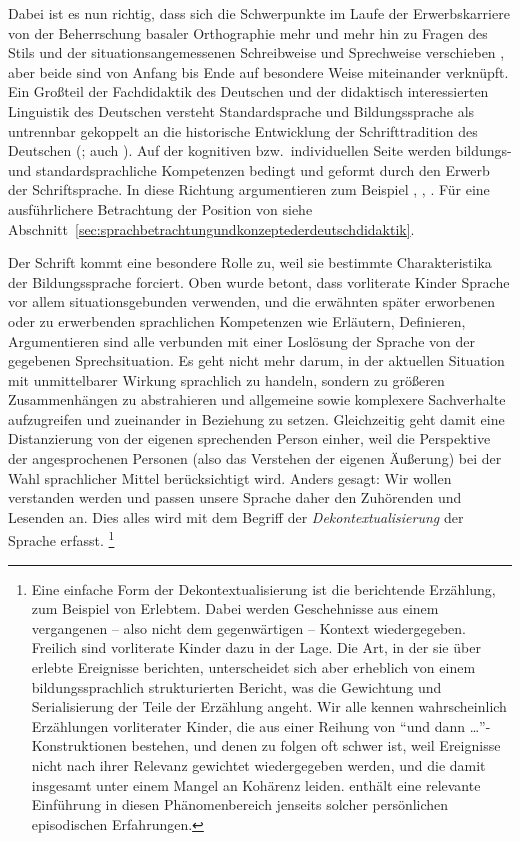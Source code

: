 Dabei ist es nun richtig, dass sich die Schwerpunkte im Laufe der Erwerbskarriere von der Beherrschung basaler Orthographie mehr und mehr hin zu Fragen des Stils und der situationsangemessenen Schreibweise und Sprechweise verschieben \citep[77]{Portmanntselikas2011}, aber beide sind von Anfang bis Ende auf besondere Weise miteinander verknüpft.
Ein Großteil der Fachdidaktik des Deutschen und der didaktisch interessierten Linguistik des Deutschen versteht Standardsprache und Bildungssprache als untrennbar gekoppelt an die historische Entwicklung der Schrifttradition des Deutschen (\citealt[130--150]{Bredel2013}; auch \citealt{Nerius2007}).
Auf der kognitiven bzw.\ individuellen Seite werden bildungs- und standardsprachliche Kompetenzen bedingt und geformt durch den Erwerb der Schriftsprache.
In diese Richtung argumentieren zum Beispiel \citet[4,12,14,15]{Eisenberg2004}, \citet[71,78]{Portmanntselikas2011}, \citet[6]{Feilke2012}.
Für eine ausführlichere Betrachtung der Position von \citet{Bredel2013} siehe Abschnitt~\ref{sec:sprachbetrachtungundkonzeptederdeutschdidaktik}.


Der Schrift kommt eine besondere Rolle zu, weil sie bestimmte Charakteristika der Bildungssprache forciert.
Oben wurde betont, dass vorliterate Kinder Sprache vor allem situationsgebunden verwenden, und die erwähnten später erworbenen oder zu erwerbenden sprachlichen Kompetenzen wie Erläutern, Definieren, Argumentieren sind alle verbunden mit einer Loslösung der Sprache von der gegebenen Sprechsituation.
Es geht nicht mehr darum, in der aktuellen Situation mit unmittelbarer Wirkung sprachlich zu handeln, sondern zu größeren Zusammenhängen zu abstrahieren und allgemeine sowie komplexere Sachverhalte aufzugreifen und zueinander in Beziehung zu setzen.
Gleichzeitig geht damit eine Distanzierung von der eigenen sprechenden Person einher, weil die Perspektive der angesprochenen Personen (also das Verstehen der eigenen Äußerung) bei der Wahl sprachlicher Mittel berücksichtigt wird.
Anders gesagt:
Wir wollen verstanden werden und passen unsere Sprache daher den Zuhörenden und Lesenden an.
Dies alles wird mit dem Begriff der \textit{Dekontextualisierung} der Sprache erfasst.%
\footnote{Eine einfache Form der Dekontextualisierung ist die berichtende Erzählung, zum Beispiel von Erlebtem.
Dabei werden Geschehnisse aus einem vergangenen -- also nicht dem gegenwärtigen -- Kontext wiedergegeben.
Freilich sind vorliterate Kinder dazu in der Lage.
Die Art, in der sie über erlebte Ereignisse berichten, unterscheidet sich aber erheblich von einem bildungssprachlich strukturierten Bericht, was die Gewichtung und Serialisierung der Teile der Erzählung angeht.
Wir alle kennen wahrscheinlich Erzählungen vorliterater Kinder, die aus einer Reihung von "`und dann \ldots"'-Konstruktionen bestehen, und denen zu folgen oft schwer ist, weil Ereignisse nicht nach ihrer Relevanz gewichtet wiedergegeben werden, und die damit insgesamt unter einem Mangel an Kohärenz leiden.
\citet{Bredel2013} enthält eine relevante Einführung in diesen Phänomenbereich jenseits solcher persönlichen episodischen Erfahrungen.}

